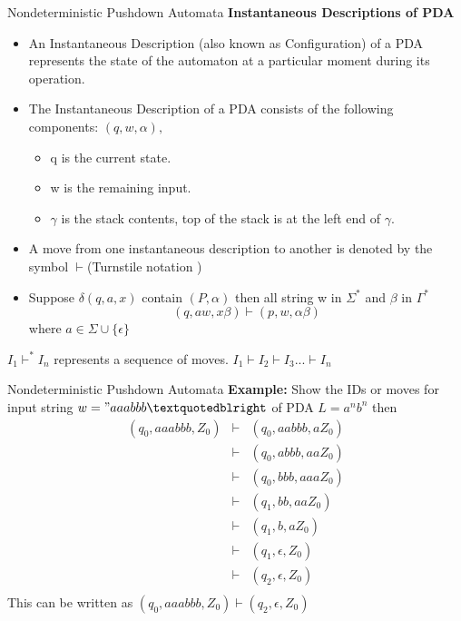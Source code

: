 \documentclass{beamer}
\begin{document}
\begin{frame}{Nondeterministic Pushdown Automata}
	\small
	\textbf{Instantaneous Descriptions of PDA}
	\begin{itemize}
		\item An Instantaneous Description (also known as Configuration) of a PDA represents the state of the automaton at a particular moment during its operation.
		\item The Instantaneous Description of a PDA consists of the following components: $(q, w, \alpha),$
		\begin{itemize}
			\item q is the current state.
			\item w is the remaining input.
			\item $\gamma$ is the stack contents, top of the stack is at the left end of $\gamma$.
		\end{itemize}
	 \item A move from one instantaneous description to another is denoted by the symbol $\vdash$(Turnstile notation )
	 \item Suppose $\delta(q,a,x) $ contain $(P,\alpha)$ then all string w in $\Sigma^*$ and $\beta$ in $\Gamma^*$
	 $$(q,aw,x\beta) \vdash (p,w,\alpha \beta)$$ where $a\in \Sigma \cup \{\epsilon\}$
	\end{itemize}
$I_1 \vdash^* I_n$ represents a sequence of moves. $I_1 \vdash I_2\vdash I_3... \vdash I_n$
\end{frame}	
\begin{frame}{Nondeterministic Pushdown Automata}
	\textbf{Example:}
	Show the IDs or moves for input string $w ="aaabbb”$ of PDA $L=a^nb^n$ then 
	\begin{eqnarray*}
		(q_0, aaabbb, Z_0) &\vdash& (q_0,aabbb ,aZ_0) \\
		  &\vdash& (q_0,abbb, aaZ_0)  \\
		 &\vdash& (q_0, bbb,aaaZ_0)   \\
		  &\vdash& (q_1, bb,aaZ_0)   \\
	 &\vdash& (q_1,b,aZ_0 )   \\
	 &\vdash& (q_1,\epsilon,Z_0 )   \\
	  &\vdash& (q_2,\epsilon,Z_0 )   \\
	\end{eqnarray*}
This can be written as 	$(q_0, aaabbb, Z_0) \vdash (q_2,\epsilon,Z_0 ) $
\end{frame}	
\end{document}
